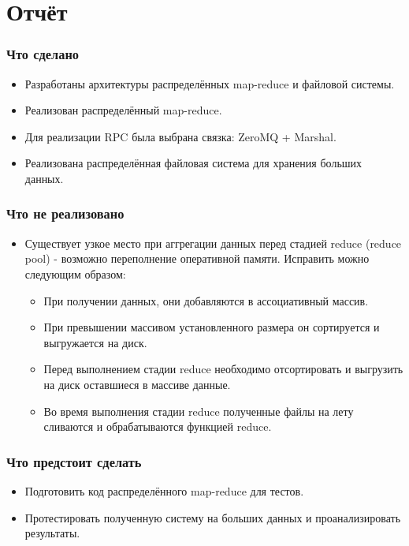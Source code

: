 \documentclass{beamer}
\begin{document}
\section{Отчёт}
    \begin{frame}
    \frametitle{Что сделано}
        \begin{itemize}
            \item Разработаны архитектуры распределённых map-reduce и файловой системы.
            \item Реализован распределённый map-reduce.
            \item Для реализации RPC была выбрана связка: ZeroMQ + Marshal.
            \item Реализована распределённая файловая система для хранения больших данных.
        \end{itemize} 
    \end{frame}

    \begin{frame}
    \frametitle{Что не реализовано}
        \begin{itemize}            
            \item Существует узкое место при аггрегации данных перед стадией reduce (reduce pool) - возможно переполнение оперативной памяти. Исправить можно следующим образом:
            \begin{itemize}
                \item При получении данных, они добавляются в ассоциативный массив.
                \item При превышении массивом установленного размера он сортируется и выгружается на диск.
                \item Перед выполнением стадии reduce необходимо отсортировать и выгрузить на диск оставшиеся в массиве данные.
                \item Во время выполнения стадии reduce полученные файлы на лету сливаются и обрабатываются функцией reduce.
            \end{itemize} 
        \end{itemize} 
    \end{frame}

    \begin{frame}
    \frametitle{Что предстоит сделать}
        \begin{itemize}
            \item Подготовить код распределённого map-reduce для тестов.
            \item Протестировать полученную систему на больших данных и проанализировать результаты.
        \end{itemize} 
    \end{frame}

\begin{frame}
    \titlepage
\end{frame}
\end{document}
